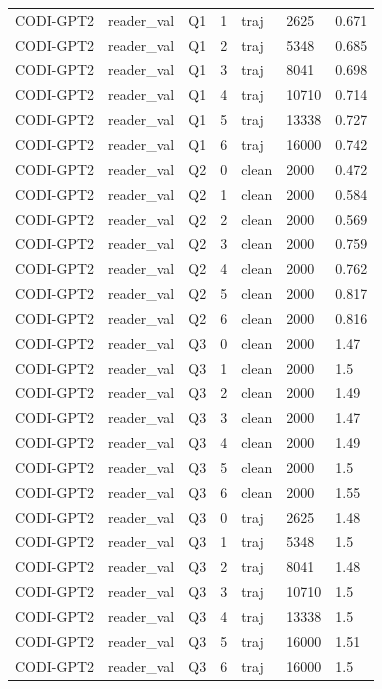 \begin{longtable}{@{}p{}p{}p{}p{}p{}p{}p{}@{}}
CODI-GPT2 & reader\_val & Q1 & 1 & traj & 2625 & 0.671 \\
CODI-GPT2 & reader\_val & Q1 & 2 & traj & 5348 & 0.685 \\
CODI-GPT2 & reader\_val & Q1 & 3 & traj & 8041 & 0.698 \\
CODI-GPT2 & reader\_val & Q1 & 4 & traj & 10710 & 0.714 \\
CODI-GPT2 & reader\_val & Q1 & 5 & traj & 13338 & 0.727 \\
CODI-GPT2 & reader\_val & Q1 & 6 & traj & 16000 & 0.742 \\
CODI-GPT2 & reader\_val & Q2 & 0 & clean & 2000 & 0.472 \\
CODI-GPT2 & reader\_val & Q2 & 1 & clean & 2000 & 0.584 \\
CODI-GPT2 & reader\_val & Q2 & 2 & clean & 2000 & 0.569 \\
CODI-GPT2 & reader\_val & Q2 & 3 & clean & 2000 & 0.759 \\
CODI-GPT2 & reader\_val & Q2 & 4 & clean & 2000 & 0.762 \\
CODI-GPT2 & reader\_val & Q2 & 5 & clean & 2000 & 0.817 \\
CODI-GPT2 & reader\_val & Q2 & 6 & clean & 2000 & 0.816 \\
CODI-GPT2 & reader\_val & Q3 & 0 & clean & 2000 & 1.47 \\
CODI-GPT2 & reader\_val & Q3 & 1 & clean & 2000 & 1.5 \\
CODI-GPT2 & reader\_val & Q3 & 2 & clean & 2000 & 1.49 \\
CODI-GPT2 & reader\_val & Q3 & 3 & clean & 2000 & 1.47 \\
CODI-GPT2 & reader\_val & Q3 & 4 & clean & 2000 & 1.49 \\
CODI-GPT2 & reader\_val & Q3 & 5 & clean & 2000 & 1.5 \\
CODI-GPT2 & reader\_val & Q3 & 6 & clean & 2000 & 1.55 \\
CODI-GPT2 & reader\_val & Q3 & 0 & traj & 2625 & 1.48 \\
CODI-GPT2 & reader\_val & Q3 & 1 & traj & 5348 & 1.5 \\
CODI-GPT2 & reader\_val & Q3 & 2 & traj & 8041 & 1.48 \\
CODI-GPT2 & reader\_val & Q3 & 3 & traj & 10710 & 1.5 \\
CODI-GPT2 & reader\_val & Q3 & 4 & traj & 13338 & 1.5 \\
CODI-GPT2 & reader\_val & Q3 & 5 & traj & 16000 & 1.51 \\
CODI-GPT2 & reader\_val & Q3 & 6 & traj & 16000 & 1.5 \\

\end{longtable}
